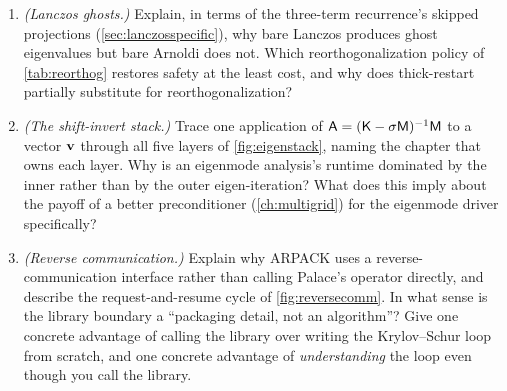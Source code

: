 \begin{enumerate}[nosep]
  and explain why keeping one extra direction beyond the wanted count is worthwhile.
  \item \emph{(Lanczos ghosts.)} Explain, in terms of the three-term recurrence's skipped
  projections (\cref{sec:lanczosspecific}), why bare Lanczos produces ghost eigenvalues but bare
  Arnoldi does not. Which reorthogonalization policy of \cref{tab:reorthog} restores safety at the
  least cost, and why does thick-restart partially substitute for reorthogonalization?
  \item \emph{(The shift-invert stack.)} Trace one application of $\mathsf{A} = (\mathsf{K} -
  \sigma\mathsf{M})^{-1}\mathsf{M}$ to a vector $\mathbf{v}$ through all five layers of \cref{fig:eigenstack},
  naming the chapter that owns each layer. Why is an eigenmode analysis's runtime dominated by the
  inner  rather than by the outer eigen-iteration? What does this imply about the
  payoff of a better preconditioner (\cref{ch:multigrid}) for the eigenmode driver specifically?
  \item \emph{(Reverse communication.)} Explain why ARPACK uses a reverse-communication interface
  rather than calling Palace's operator directly, and describe the request-and-resume cycle of
  \cref{fig:reversecomm}. In what sense is the library boundary a ``packaging detail, not an
  algorithm''? Give one concrete advantage of calling the library over writing the Krylov--Schur loop
  from scratch, and one concrete advantage of \emph{understanding} the loop even though you call the
  library.
\end{enumerate}
